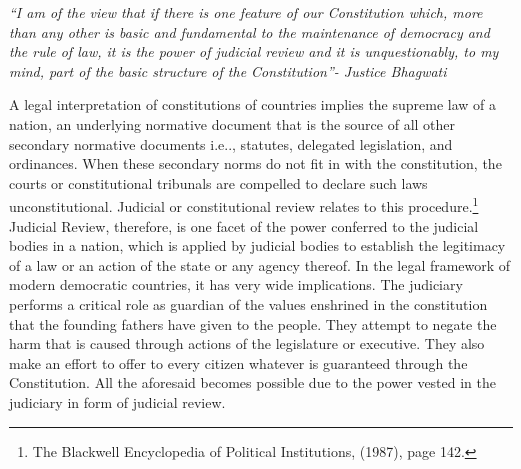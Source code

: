 \setcounter{figure}{0}
\setcounter{table}{0}
\setcounter{footnote}{0}

\label{2016-art2}
\vspace{-.3cm}



\begin{multicols}{2}

\noi
\textit{“I am of the view that if there is one feature of our Constitution which, more than any
other is basic and fundamental to the maintenance of democracy and the rule of law,
it is the power of judicial review and it is unquestionably, to my mind, part of the basic
structure of the Constitution”- Justice Bhagwati}


\noi
A legal interpretation of constitutions of countries implies the supreme law of a nation,
an underlying normative document that is the source of all other secondary normative
documents i.e.., statutes, delegated legislation, and ordinances. When these secondary
norms do not fit in with the constitution, the courts or constitutional tribunals are
compelled to declare such laws unconstitutional. Judicial or constitutional review
relates to this procedure.\footnote{ The Blackwell Encyclopedia of Political Institutions, (1987), page 142.}
Judicial Review, therefore, is one facet of the power
conferred to the judicial bodies in a nation, which is applied by judicial bodies to
establish the legitimacy of a law or an action of the state or any agency thereof. In the
legal framework of modern democratic countries, it has very wide implications. The
judiciary performs a critical role as guardian of the values enshrined in the constitution
that the founding fathers have given to the people. They attempt to negate the harm
that is caused through actions of the legislature or executive. They also make an effort
to offer to every citizen whatever is guaranteed through the Constitution. All the
aforesaid becomes possible due to the power vested in the judiciary in form of judicial
review.


\end{multicols}
